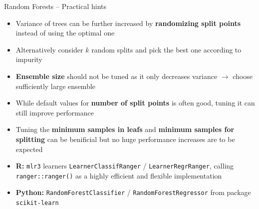 
\begin{frame}{Random Forests -- Practical hints}

\begin{itemize}
    \item Variance of trees can be further increased by \textbf{randomizing split points} instead of using the optimal one
    \item Alternatively consider $k$ random splits and pick the best one according to impurity 
\end{itemize}

\medskip

\begin{itemize}
    \item \textbf{Ensemble size} should not be tuned as it only decreases variance $\longrightarrow$ choose sufficiently large ensemble
    \item While default values for \textbf{number of split points} is often good, tuning it can still improve performance
    \item Tuning the \textbf{minimum samples in leafs} and \textbf{minimum samples for splitting} can be benificial but no huge performance increases are to be expected 
\end{itemize}

\medskip


\begin{itemize}
  \item \textbf{R:} \texttt{mlr3} learners \texttt{LearnerClassifRanger} / 
    \texttt{LearnerRegrRanger}, calling \texttt{ranger::ranger()} as a highly efficient and flexible implementation
  \item \textbf{Python:} \texttt{RandomForestClassifier} / 
  \texttt{RandomForestRegressor} from package \texttt{scikit-learn}
\end{itemize}

\end{frame}



